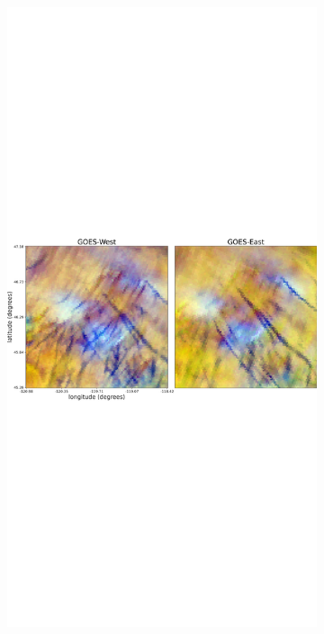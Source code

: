 \begin{figure}
\centering

\begin{subfigure}[t]{.49\linewidth}
  \centering
    \includegraphics[width=\linewidth]{figures/west_best.png}

\end{subfigure}
\end{figure}

